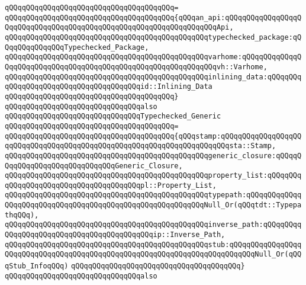 \verb|qQQqqQQqqQQqqQQqqQQqqQQqqQQqqQQqqQQqqQQq=|\newline
\verb|qQQqqQQqqQQqqQQqqQQqqQQqqQQqqQQqqQQqqQQq{qQQqan_api:qQQqqQQqqQQqqQQqqQQqqQQqqQQqqQQqqQQqqQQqqQQqqQQqqQQqqQQqqQQqqQQqqQQqApi,|\newline
\verb|qQQqqQQqqQQqqQQqqQQqqQQqqQQqqQQqqQQqqQQqqQQqqQQqtypechecked_package:qQQqqQQqqQQqqQQqTypechecked_Package,|\newline
\verb|qQQqqQQqqQQqqQQqqQQqqQQqqQQqqQQqqQQqqQQqqQQqqQQqvarhome:qQQqqQQqqQQqqQQqqQQqqQQqqQQqqQQqqQQqqQQqqQQqqQQqqQQqqQQqqQQqqQQqvh::Varhome,|\newline
\verb|qQQqqQQqqQQqqQQqqQQqqQQqqQQqqQQqqQQqqQQqqQQqqQQqinlining_data:qQQqqQQqqQQqqQQqqQQqqQQqqQQqqQQqqQQqqQQqid::Inlining_Data|\newline
\verb|qQQqqQQqqQQqqQQqqQQqqQQqqQQqqQQqqQQqqQQq}|\newline
\newline
\verb|qQQqqQQqqQQqqQQqqQQqqQQqqQQqqQQqalso|\newline
\verb|qQQqqQQqqQQqqQQqqQQqqQQqqQQqqQQqTypechecked_Generic|\newline
\verb|qQQqqQQqqQQqqQQqqQQqqQQqqQQqqQQqqQQqqQQq=|\newline
\verb|qQQqqQQqqQQqqQQqqQQqqQQqqQQqqQQqqQQqqQQq{qQQqstamp:qQQqqQQqqQQqqQQqqQQqqQQqqQQqqQQqqQQqqQQqqQQqqQQqqQQqqQQqqQQqqQQqqQQqqQQqsta::Stamp,|\newline
\verb|qQQqqQQqqQQqqQQqqQQqqQQqqQQqqQQqqQQqqQQqqQQqqQQqgeneric_closure:qQQqqQQqqQQqqQQqqQQqqQQqqQQqqQQqGeneric_Closure,|\newline
\verb|qQQqqQQqqQQqqQQqqQQqqQQqqQQqqQQqqQQqqQQqqQQqqQQqproperty_list:qQQqqQQqqQQqqQQqqQQqqQQqqQQqqQQqqQQqqQQqpl::Property_List,|\newline
\verb|qQQqqQQqqQQqqQQqqQQqqQQqqQQqqQQqqQQqqQQqqQQqqQQqtypepath:qQQqqQQqqQQqqQQqqQQqqQQqqQQqqQQqqQQqqQQqqQQqqQQqqQQqqQQqqQQqNull_Or(qQQqtdt::TypepathqQQq),|\newline
\verb|qQQqqQQqqQQqqQQqqQQqqQQqqQQqqQQqqQQqqQQqqQQqqQQqinverse_path:qQQqqQQqqQQqqQQqqQQqqQQqqQQqqQQqqQQqqQQqqQQqip::Inverse_Path,|\newline
\verb|qQQqqQQqqQQqqQQqqQQqqQQqqQQqqQQqqQQqqQQqqQQqqQQqstub:qQQqqQQqqQQqqQQqqQQqqQQqqQQqqQQqqQQqqQQqqQQqqQQqqQQqqQQqqQQqqQQqqQQqqQQqqQQqNull_Or(qQQqStub_InfoqQQq)|\newline
\verb|qQQqqQQqqQQqqQQqqQQqqQQqqQQqqQQqqQQqqQQq}|\newline
\newline
\verb|qQQqqQQqqQQqqQQqqQQqqQQqqQQqqQQqalso|\newline
